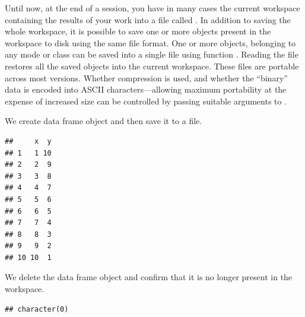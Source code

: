 \documentclass[krantz2]{krantz}\usepackage{knitr}%
\begin{document}
Until now, at the end of a session, you have in many cases the current workspace containing the results of your work into a file called . In addition to saving the whole workspace, it is possible to save one or more \Rlang objects present in the workspace to disk using the same file format. One or more objects, belonging to any mode or class can be saved into a single file using function . Reading the file restores all the saved objects into the current workspace. These files are portable across most \Rlang versions. Whether compression is used, and whether the ``binary'' data is encoded into ASCII characters---allowing maximum portability at the expense of increased size can be controlled by passing suitable arguments to .

We create data frame object and then save it to a file.

\begin{knitrout}\footnotesize
{}\color{fgcolor}\begin{kframe}
\begin{alltt}
 \hlkwb{<-} \hlstd{(} \hlstd{=} \hlopt{:}\hlstd{,}  \hlstd{=} \hlopt{:}\hlstd{)}
\end{alltt}
\begin{verbatim}
##     x  y
## 1   1 10
## 2   2  9
## 3   3  8
## 4   4  7
## 5   5  6
## 6   6  5
## 7   7  4
## 8   8  3
## 9   9  2
## 10 10  1
\end{verbatim}
\begin{alltt}
  \hlstd{=} \hlstd{)}
\end{alltt}
\end{kframe}
\end{knitrout}

We delete the data frame object and confirm that it is no longer present in the workspace.
\begin{knitrout}\footnotesize
{}\color{fgcolor}\begin{kframe}
\begin{alltt}
\hlstd{(} \hlstd{=} \hlstd{)}
\end{alltt}
\begin{verbatim}
## character(0)
\end{verbatim}
\end{kframe}
\end{knitrout}
\end{document}
